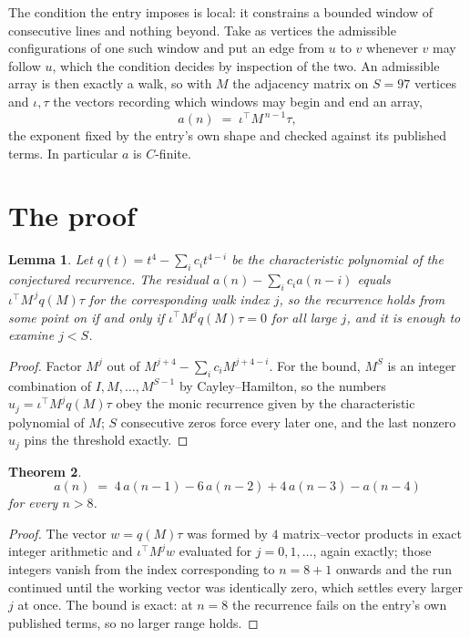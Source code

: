 \documentclass[11pt,a4paper]{article}
\theoremstyle{plain}
\newtheorem{theorem}{Theorem}
\newtheorem{lemma}[theorem]{Lemma}
\theoremstyle{definition}
\begin{document}
The condition the entry imposes is local: it constrains a bounded window of consecutive lines and nothing beyond. Take as
vertices the admissible configurations of one such window and put an edge from $u$ to $v$
whenever $v$ may follow $u$, which the condition decides by inspection of the two. An
admissible array is then exactly a walk, so with $M$ the adjacency matrix on $S=97$ vertices
and $\iota,\tau$ the vectors recording which windows may begin and end an array,
\[
a(n)\;=\;\iota^{\!\top}M^{\,n-1}\tau ,
\]
the exponent fixed by the entry's own shape and checked against its published terms. In
particular $a$ is $C$-finite.

\section{The proof}

\begin{lemma}\label{lem:crit}
Let $q(t)=t^{4}-\sum_i c_it^{4-i}$ be the characteristic polynomial of the
conjectured recurrence. The residual $a(n)-\sum_ic_ia(n-i)$ equals
$\iota^{\!\top}M^{\,j}q(M)\tau$ for the corresponding walk index $j$, so the recurrence
holds from some point on if and only if $\iota^{\!\top}M^{j}q(M)\tau=0$ for all large $j$,
and it is enough to examine $j<S$.
\end{lemma}

\begin{proof}
Factor $M^{j}$ out of $M^{j+4}-\sum_ic_iM^{j+4-i}$. For the bound, $M^{S}$
is an integer combination of $I,M,\dots,M^{S-1}$ by Cayley--Hamilton, so the numbers
$u_j=\iota^{\!\top}M^{j}q(M)\tau$ obey the monic recurrence given by the characteristic
polynomial of $M$; $S$ consecutive zeros force every later one, and the last nonzero $u_j$
pins the threshold exactly.
\end{proof}

\begin{theorem}
\[
a(n)\;=\;4\,a(n-1) - 6\,a(n-2) + 4\,a(n-3) - a(n-4)
\]
for every $n>8$.
\end{theorem}

\begin{proof}
The vector $w=q(M)\tau$ was formed by $4$ matrix--vector products in exact integer
arithmetic and $\iota^{\!\top}M^{j}w$ evaluated for $j=0,1,\dots$, again exactly; those
integers vanish from the index corresponding to $n=8+1$ onwards and the run continued
until the working vector was identically zero, which settles every larger $j$ at once. The bound is exact: at $n=8$ the recurrence fails on the entry's own published terms, so no larger range holds.
\end{proof}
\end{document}
